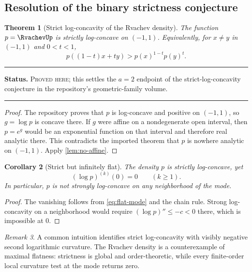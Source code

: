 \documentclass[11pt,oneside]{article}
\newtheorem{theorem}{Theorem}[section]
\newtheorem{corollary}[theorem]{Corollary}
\theoremstyle{definition}
\theoremstyle{remark}
\newtheorem{remark}[theorem]{Remark}
\newenvironment{boxedremark}{%
  \par\smallskip\noindent\begin{center}\begin{minipage}{0.94\textwidth}%
  \color{black}\hrule\vspace{0.6em}\small
}{%
  \vspace{0.6em}\hrule\end{minipage}\end{center}\smallskip
}
\newcommand{\ProvedHere}{\textsc{Proved here}}
\newcommand{\Status}[1]{%
  \begin{boxedremark}\textbf{Status.} #1.\end{boxedremark}}
\begin{document}
\subsection{Resolution of the binary strictness conjecture}
\begin{theorem}[Strict log-concavity of the Rvachev density]\label{thm:strict-logconcave}
The function $p=\RvachevUp$ is strictly log-concave on $(-1,1)$.  Equivalently, for
$x\ne y$ in $(-1,1)$ and $0<t<1$,
\begin{equation}\label{eq:strict-logconcave}
 p((1-t)x+ty)>p(x)^{1-t}p(y)^t.
\end{equation}
\end{theorem}
\Status{\ProvedHere; this settles the $a=2$ endpoint of the strict-log-concavity
conjecture in the repository's geometric-family volume}

\begin{proof}
The repository proves that $p$ is log-concave and positive on $(-1,1)$, so
$g=\log p$ is concave there.  If $g$ were affine on a nondegenerate open interval,
then $p=e^g$ would be an exponential function on that interval and therefore real
analytic there.  This contradicts the imported theorem that $p$ is nowhere
analytic on $(-1,1)$.  Apply \cref{lem:no-affine}.
\end{proof}

\begin{corollary}[Strict but infinitely flat]\label{cor:flat-strict}
The density $p$ is strictly log-concave, yet
\begin{equation}
 (\log p)^{(k)}(0)=0\qquad(k\ge1).
\end{equation}
In particular, $p$ is not strongly log-concave on any neighborhood of the mode.
\end{corollary}

\begin{proof}
The vanishing follows from \eqref{eq:flat-mode} and the chain rule.  Strong
log-concavity on a neighborhood would require $(\log p)''\le-c<0$ there, which
is impossible at $0$.
\end{proof}

\begin{remark}
A common intuition identifies strict log-concavity with visibly negative second
logarithmic curvature.  The Rvachev density is a counterexample of maximal
flatness: strictness is global and order-theoretic, while every finite-order local
curvature test at the mode returns zero.
\end{remark}
\end{document}
